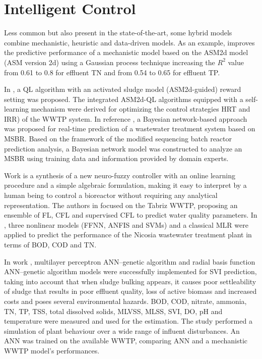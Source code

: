 \section{Intelligent Control}
\label{s:RelatedWorks-Control}

Less common but also present in the state-of-the-art, some hybrid models combine mechanistic, heuristic and data-driven models. As an example, \cite{Hvala2020} improves the predictive performance of a mechanistic model based on the ASM2d model (\ac{ASM} version 2d) using a Gaussian process technique increasing the \begin{math}R^2\end{math} value from 0.61 to 0.8 for effluent \ac{TN} and from 0.54 to 0.65 for effluent \ac{TP}.

In \cite{Pang2019}, a \ac{QL} algorithm with an activated sludge model (\ac{ASM}2d-guided) reward setting was proposed. The integrated \ac{ASM}2d-QL algorithms equipped with a self-learning mechanism were derived for optimizing the control strategies \ac{HRT} and \ac{IRR}) of the \ac{WWTP} system. In reference \cite{Li2013}, a Bayesian network-based approach was proposed for real-time prediction of a wastewater treatment system based on \ac{MSBR}. Based on the framework of the modified sequencing batch reactor prediction analysis, a Bayesian network model was constructed to analyze an \ac{MSBR} using training data and information provided by domain experts.

Work \cite{Haggege2005} is a synthesis of a new neuro-fuzzy controller with an online learning procedure and a simple algebraic formulation, making it easy to interpret by a human being to control a bioreactor without requiring any analytical representation. The authors in \cite{Nadiri2018} focused on the Tabriz \ac{WWTP}, proposing an ensemble of \ac{FL}, \ac{CFL}  and supervised \ac{CFL} to predict water quality parameters. In \cite{Nourani2018}, three nonlinear models (\ac{FFNN}, \ac{ANFIS} and \ac{SVM}s) and a classical \ac{MLR} were applied to predict the performance of the Nicosia wastewater treatment plant in terms of \ac{BOD}, \ac{COD} and \ac{TN}. 

In work \cite{Bagheri2015}, multilayer perceptron \ac{ANN}–genetic algorithm and radial basis function \ac{ANN}–genetic algorithm models were successfully implemented for \ac{SVI} prediction, taking into account that when sludge bulking appears, it causes poor settleability of sludge that results in poor effluent quality, loss of active biomass and increased costs and poses several environmental hazards. \ac{BOD}, \ac{COD}, nitrate, ammonia, \ac{TN}, \ac{TP}, \ac{TSS}, total dissolved solids, \ac{MLVSS}, \ac{MLSS}, \ac{SVI}, \ac{DO}, pH and temperature were measured and used for the estimation. The study \cite{Raduly2007} performed a simulation of plant behaviour over a wide range of influent disturbances. An \ac{ANN} was trained on the available \ac{WWTP}, comparing \ac{ANN} and a mechanistic \ac{WWTP} model’s performances.


